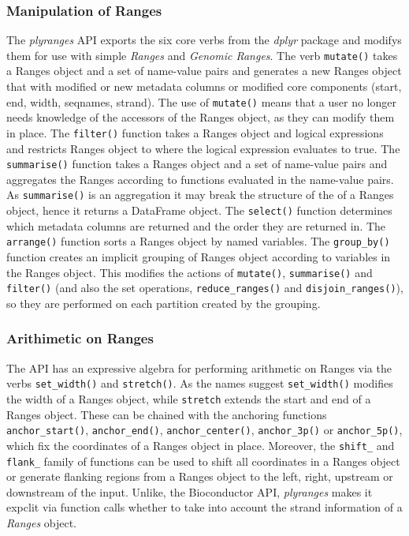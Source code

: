 \documentclass[10pt,letterpaper]{article}
\begin{document}
\hypertarget{manipulation-of-ranges}{%
\subsubsection{Manipulation of Ranges}\label{manipulation-of-ranges}}

The \emph{plyranges} API exports the six core verbs from the
\emph{dplyr} package and modifys them for use with simple \emph{Ranges}
and \emph{Genomic Ranges}. The verb \texttt{mutate()} takes a Ranges
object and a set of name-value pairs and generates a new Ranges object
that with modified or new metadata columns or modified core components
(start, end, width, seqnames, strand). The use of \texttt{mutate()}
means that a user no longer needs knowledge of the accessors of the
Ranges object, as they can modify them in place. The \texttt{filter()}
function takes a Ranges object and logical expressions and restricts
Ranges object to where the logical expression evaluates to true. The
\texttt{summarise()} function takes a Ranges object and a set of
name-value pairs and aggregates the Ranges according to functions
evaluated in the name-value pairs. As \texttt{summarise()} is an
aggregation it may break the structure of the of a Ranges object, hence
it returns a DataFrame object. The \texttt{select()} function determines
which metadata columns are returned and the order they are returned in.
The \texttt{arrange()} function sorts a Ranges object by named
variables. The \texttt{group\_by()} function creates an implicit
grouping of Ranges object according to variables in the Ranges object.
This modifies the actions of \texttt{mutate()}, \texttt{summarise()} and
\texttt{filter()} (and also the set operations,
\texttt{reduce\_ranges()} and \texttt{disjoin\_ranges()}), so they are
performed on each partition created by the grouping.

\hypertarget{arithimetic-on-ranges}{%
\subsubsection{Arithimetic on Ranges}\label{arithimetic-on-ranges}}

The API has an expressive algebra for performing arithmetic on Ranges
via the verbs \texttt{set\_width()} and \texttt{stretch()}. As the names
suggest \texttt{set\_width()} modifies the width of a Ranges object,
while \texttt{stretch} extends the start and end of a Ranges object.
These can be chained with the anchoring functions
\texttt{anchor\_start()}, \texttt{anchor\_end()},
\texttt{anchor\_center()}, \texttt{anchor\_3p()} or
\texttt{anchor\_5p()}, which fix the coordinates of a Ranges object in
place. Moreover, the \texttt{shift\_} and \texttt{flank\_} family of
functions can be used to shift all coordinates in a Ranges object or
generate flanking regions from a Ranges object to the left, right,
upstream or downstream of the input. Unlike, the Bioconductor API,
\emph{plyranges} makes it expclit via function calls whether to take
into account the strand information of a \emph{Ranges} object.
\end{document}
